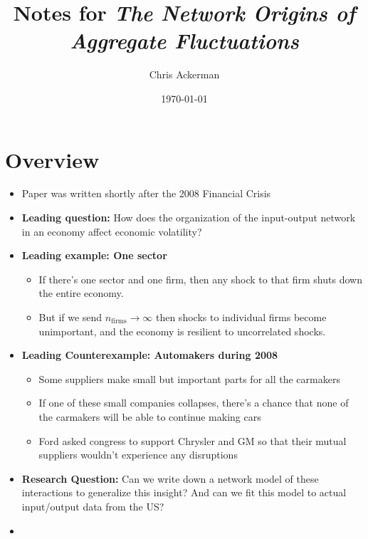 
\title{Notes for \emph{The Network Origins of Aggregate Fluctuations}}
\author{Chris Ackerman}
\date{\today}



\maketitle
\section{Overview}
\begin{itemize}
\item Paper was written shortly after the 2008 Financial Crisis
\item \textbf{Leading question:} How does the organization of the input-output network in an economy affect economic volatility?
\item \textbf{Leading example: One sector}
  \begin{itemize}
  \item If there's one sector and one firm, then any shock to that firm shuts down the entire economy.
    \item But if we send $n_{\text{firms}} \to \infty$ then shocks to individual firms become unimportant, and the economy is resilient to uncorrelated shocks.
    \end{itemize}
  \item \textbf{Leading Counterexample: Automakers during 2008}
    \begin{itemize}
    \item Some suppliers make small but important parts for all the carmakers
    \item If one of these small companies collapses, there's a chance that none of the carmakers will be able to continue making cars
      \item Ford asked congress to support Chrysler and GM so that their mutual suppliers wouldn't experience any disruptions
    \end{itemize}
    \item \textbf{Research Question: } Can we write down a network model of these interactions to generalize this insight? And can we fit this model to actual input/output data from the US?
      \item {}
\end{itemize}

